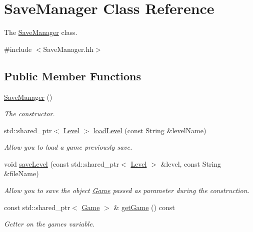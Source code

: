 \hypertarget{classSaveManager}{}\section{Save\+Manager Class Reference}
\label{classSaveManager}


The \hyperlink{classSaveManager}{Save\+Manager} class.  




{\ttfamily \#include $<$Save\+Manager.\+hh$>$}

\subsection*{Public Member Functions}
\begin{DoxyCompactItemize}
\item 
\mbox{\label{classSaveManager_ab8bb791be648b9b91db44aa11f6e8e14}} 
\hyperlink{classSaveManager_ab8bb791be648b9b91db44aa11f6e8e14}{Save\+Manager} ()
\begin{DoxyCompactList}\small\item\em The constructor. \end{DoxyCompactList}\item 
std\+::shared\+\_\+ptr$<$ \hyperlink{classLevel}{Level} $>$ \hyperlink{classSaveManager_aa0661d6a8f9c0330755a8e03f8631992}{load\+Level} (const String \&level\+Name)
\begin{DoxyCompactList}\small\item\em Allow you to load a game previously save. \end{DoxyCompactList}\item 
void \hyperlink{classSaveManager_a3fd6a2e996ee848bfec385a288f44461}{save\+Level} (const std\+::shared\+\_\+ptr$<$ \hyperlink{classLevel}{Level} $>$ \&level, const String \&file\+Name)
\begin{DoxyCompactList}\small\item\em Allow you to save the object \hyperlink{classGame}{Game} passed as parameter during the construction. \end{DoxyCompactList}\item 
\mbox{\label{classSaveManager_a94d97899e285c0bbd46f4fdb42767f79}} 
const std\+::shared\+\_\+ptr$<$ \hyperlink{classGame}{Game} $>$ \& \hyperlink{classSaveManager_a94d97899e285c0bbd46f4fdb42767f79}{get\+Game} () const
\begin{DoxyCompactList}\small\item\em Getter on the game\textquotesingle{}s variable. \end{DoxyCompactList}\end{DoxyCompactItemize}


